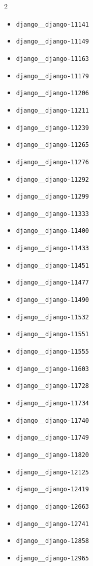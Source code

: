 \documentclass{article}
\begin{document}
\begin{multicols}{2}
\begin{itemize}
    \item \texttt{django\_\_django-11141}
    \item \texttt{django\_\_django-11149}
    \item \texttt{django\_\_django-11163}
    \item \texttt{django\_\_django-11179}
    \item \texttt{django\_\_django-11206}
    \item \texttt{django\_\_django-11211}
    \item \texttt{django\_\_django-11239}
    \item \texttt{django\_\_django-11265}
    \item \texttt{django\_\_django-11276}
    \item \texttt{django\_\_django-11292}
    \item \texttt{django\_\_django-11299}
    \item \texttt{django\_\_django-11333}
    \item \texttt{django\_\_django-11400}
    \item \texttt{django\_\_django-11433}
    \item \texttt{django\_\_django-11451}
    \item \texttt{django\_\_django-11477}
    \item \texttt{django\_\_django-11490}
    \item \texttt{django\_\_django-11532}
    \item \texttt{django\_\_django-11551}
    \item \texttt{django\_\_django-11555}
    \item \texttt{django\_\_django-11603}
    \item \texttt{django\_\_django-11728}
    \item \texttt{django\_\_django-11734}
    \item \texttt{django\_\_django-11740}
    \item \texttt{django\_\_django-11749}
    \item \texttt{django\_\_django-11820}
    \item \texttt{django\_\_django-12125}
    \item \texttt{django\_\_django-12419}
    \item \texttt{django\_\_django-12663}
    \item \texttt{django\_\_django-12741}
    \item \texttt{django\_\_django-12858}
    \item \texttt{django\_\_django-12965}

\end{itemize}
\end{multicols}
\end{document}
